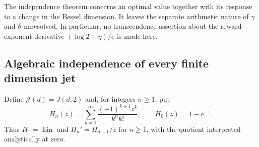 \documentclass[11pt,a4paper]{article}
\theoremstyle{definition}
\theoremstyle{remark}
\numberwithin{equation}{section}
\begin{document}
The independence theorem concerns an optimal value together with its
response to a change in the Bessel dimension. It leaves the separate
arithmetic nature of $\gamma$ and $\delta$ unresolved. In particular,
no transcendence assertion about the reward-exponent derivative
$(\log2-\eta)/e$ is made here.


\subsection{Algebraic independence of every finite dimension jet}

Define $\mathcal J(d)=J(d,2)$ and, for integers $n\ge1$, put
\[
 H_n(z)=\sum_{k=1}^{\infty}\frac{(-1)^{k+1}z^k}{k^n k!},
 \qquad H_0(z)=1-e^{-z}.
\]
Thus $H_1=\operatorname{Ein}$ and $H_n'=H_{n-1}/z$ for $n\ge1$,
with the quotient interpreted analytically at zero.
\end{document}
